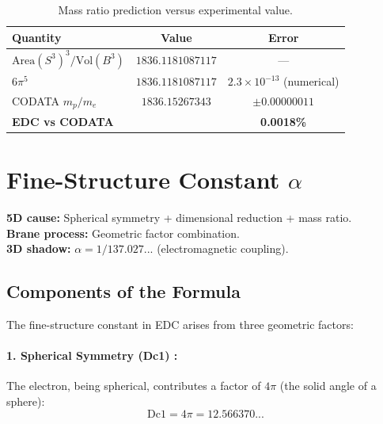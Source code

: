 \begin{table}[H]
\centering
\begin{tabular}{lcc}
\toprule
\textbf{Quantity} & \textbf{Value} & \textbf{Error} \\
\midrule
$\text{Area}(S^3)^3 / \text{Vol}(B^3)$ & $1836.1181087117$ & --- \\
$6\pi^5$ & $1836.1181087117$ & $2.3 \times 10^{-13}$ (numerical) \\
CODATA $m_p/m_e$ & $1836.15267343$ & $\pm 0.00000011$ \\
\midrule
\textbf{EDC vs CODATA} & & \textbf{0.0018\%} \\
\bottomrule
\end{tabular}
\caption{Mass ratio prediction versus experimental value.}
\label{tab:ch2_mass_ratio}
\end{table}


\section{Fine-Structure Constant $\alpha$}
\label{sec:ch2_alpha}

\begin{tcolorbox}[colback=gray!5!white, colframe=gray!50!black,
    title=\textbf{5D Cause → 3D Shadow}]
\textbf{5D cause:} Spherical symmetry + dimensional reduction + mass ratio.\\
\textbf{Brane process:} Geometric factor combination.\\
\textbf{3D shadow:} $\alpha = 1/137.027...$ (electromagnetic coupling).
\end{tcolorbox}

\subsection{Components of the Formula}

The fine-structure constant in EDC arises from three geometric factors:

\paragraph{1. Spherical Symmetry (Dc1) \tagDc{}:}
The electron, being spherical, contributes a factor of $4\pi$ (the solid angle of a sphere):
\begin{equation}
\text{Dc1} = 4\pi = 12.566370...
\label{eq:ch2_dc1}
\end{equation}

